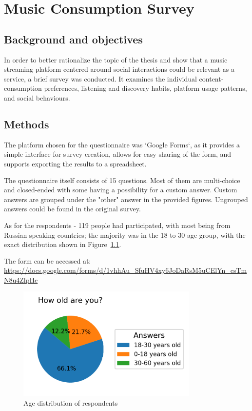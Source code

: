 \chapter{Music Consumption Survey}\label{chap:survey}


\section{Background and objectives}
In order to better rationalize the topic of the thesis and show that a music streaming platform centered around social
interactions could be relevant as a service, a brief survey was conducted. It examines the
individual content‐consumption preferences, listening and discovery habits, platform usage patterns, and
social behaviours.


\section{Methods}
The platform chosen for the questionnaire was `Google Forms`\cite{googleforms}, as it provides a simple interface for
survey creation, allows for easy sharing of the form, and supports exporting the results to a spreadsheet.

The questionnaire itself consists of 15 questions.
Most of them are multi-choice and closed-ended with some having a possibility for a custom answer.
Custom answers are grouped under the "other" answer in the provided figures. Ungrouped answers could be found in the
original survey.

As for the respondents - 119 people had participated, with most being from Russian-speaking countries;
the majority was in the 18 to 30 age group, with the exact distribution shown in Figure~\ref{fig:age}.

The form can be accessed at: \url{https://docs.google.com/forms/d/1vhhAu_SfuHV4xy6JoDaRsM5uCElYn_csTmN8u4ZlpHc}

\begin{figure}[htbp]
    \centering
    \includegraphics[width=0.8\textwidth, keepaspectratio]{charts/age.png}
    \caption{Age distribution of respondents}
    \label{fig:age}
\end{figure}


